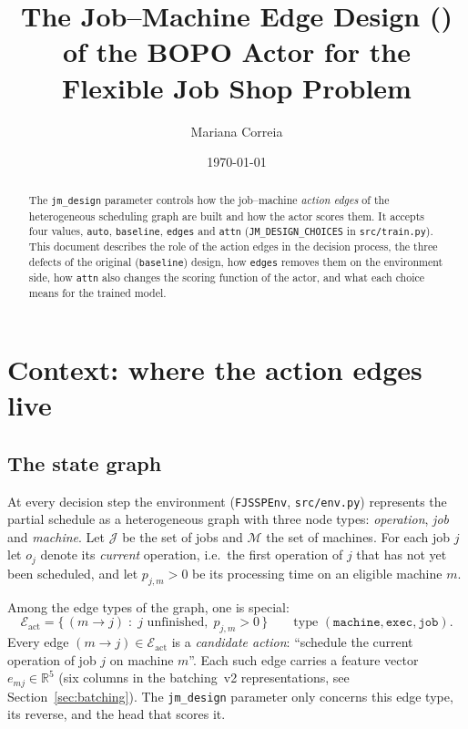 \documentclass[11pt,a4paper]{article}
\title{The Job--Machine Edge Design (\code{jm\_design})\\
of the BOPO Actor for the Flexible Job Shop Problem}
\author{Mariana Correia}
\date{\today}
\newcommand{\Jset}{\mathcal{J}}
\newcommand{\Mset}{\mathcal{M}}
\newcommand{\Eset}{\mathcal{E}}
\newcommand{\R}{\mathbb{R}}
\newcommand{\code}[1]{\texttt{#1}}
\theoremstyle{remark}
\begin{document}
\maketitle

\begin{abstract}
The \code{jm\_design} parameter controls how the job--machine \emph{action edges}
of the heterogeneous scheduling graph are built and how the actor scores them.
It accepts four values, \code{auto}, \code{baseline}, \code{edges} and \code{attn}
(\code{JM\_DESIGN\_CHOICES} in \code{src/train.py}). This document describes the
role of the action edges in the decision process, the three
defects of the original (\code{baseline}) design, how \code{edges} removes them on
the environment side, how \code{attn} also changes the scoring function of the
actor, and what each choice means for the trained model.
\end{abstract}

\tableofcontents

\section{Context: where the action edges live}
\label{sec:context}

\subsection{The state graph}
At every decision step the environment (\code{FJSSPEnv}, \code{src/env.py})
represents the partial schedule as a heterogeneous graph with three node types:
\emph{operation}, \emph{job} and \emph{machine}. Let $\Jset$ be the set of jobs and
$\Mset$ the set of machines. For each job $j$ let $o_j$ denote its \emph{current}
operation, i.e.\ the first operation of $j$ that has not yet been scheduled, and let
$p_{j,m}>0$ be its processing time on an eligible machine $m$.

Among the edge types of the graph, one is special:
\[
  \Eset_{\mathrm{act}} = \{\, (m \to j) \;:\; j \text{ unfinished},\; p_{j,m} > 0 \,\}
  \qquad \text{type } (\code{machine},\code{exec},\code{job}).
\]
Every edge $(m\to j)\in\Eset_{\mathrm{act}}$ is a \emph{candidate action}:
``schedule the current operation of job $j$ on machine $m$''. Each such edge carries a
feature vector $e_{mj}\in\R^{5}$ (six columns in the batching~v2 representations, see
Section~\ref{sec:batching}). The \code{jm\_design} parameter only concerns this edge
type, its reverse, and the head that scores it.
\end{document}

